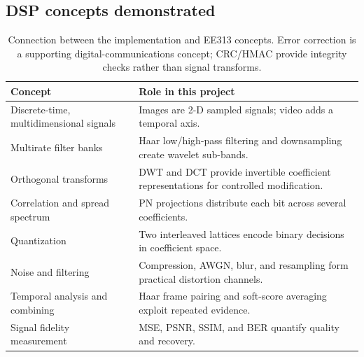 \documentclass[11pt,a4paper]{article}
\begin{document}
\subsection{DSP concepts demonstrated}
\begin{table}[H]
\centering\footnotesize
\begin{tabularx}{\textwidth}{>{\raggedright\arraybackslash}p{}>{\raggedright\arraybackslash}X}
\toprule
Concept & Role in this project \\
\midrule
Discrete-time, multidimensional signals & Images are 2-D sampled signals; video adds a temporal axis. \\
Multirate filter banks & Haar low/high-pass filtering and downsampling create wavelet sub-bands. \\
Orthogonal transforms & DWT and DCT provide invertible coefficient representations for controlled modification. \\
Correlation and spread spectrum & PN projections distribute each bit across several coefficients. \\
Quantization & Two interleaved lattices encode binary decisions in coefficient space. \\
Noise and filtering & Compression, AWGN, blur, and resampling form practical distortion channels. \\
Temporal analysis and combining & Haar frame pairing and soft-score averaging exploit repeated evidence. \\
Signal fidelity measurement & MSE, PSNR, SSIM, and BER quantify quality and recovery. \\
\bottomrule
\end{tabularx}
\caption{Connection between the implementation and EE313 concepts. Error correction is a supporting digital-communications concept; CRC/HMAC provide integrity checks rather than signal transforms.}
\end{table}
\end{document}
